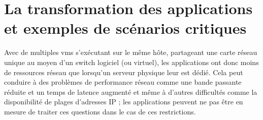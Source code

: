 \section{La transformation des applications et exemples de scénarios critiques}

Avec de multiples \glspl{vm} s'exécutant sur le même hôte, partageant une carte réseau unique au moyen d'un switch logiciel (ou virtuel), les applications ont donc moins de ressources réseau que lorsqu'un serveur physique leur est dédié. Cela peut conduire à des problèmes de performance réseau comme une bande passante réduite et un temps de latence augmenté et même à d'autres difficultés comme la disponibilité de plages d'adresses IP ; les applications peuvent ne pas être en mesure de traiter ces questions dans le cas de ces restrictions.




